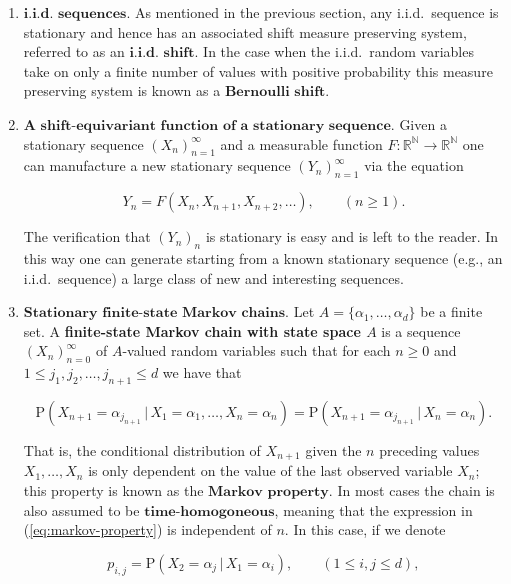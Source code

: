 \documentclass[11pt]{report}
\newcommand{\R}{\mathbb{R}}
\newcommand{\N}{\mathbb{N}}
\theoremstyle{plain}
\theoremstyle{definition}
\begin{document}
\begin{enumerate}[label=\arabic*.]
\item $\textbf{i.i.d. sequences.}$ As mentioned in the previous section, any i.i.d.\ sequence is stationary and hence has an associated shift measure preserving system, referred to as an $\textbf{i.i.d. shift}$. In the case when the i.i.d.\ random variables take on only a finite number of values with positive probability this measure preserving system is known as a $\textbf{Bernoulli shift}$.
\item $\textbf{A shift-equivariant function of a stationary sequence.}$ Given a stationary sequence $(X_n)_{n=1}^\infty$ and a measurable function $F:\R^\N\to\R^\N$ one can manufacture a new stationary sequence $(Y_n)_{n=1}^\infty$ via the equation

\begin{equation*} \tag{15}\label{eq:shift-equivariant}
Y_n = F(X_n,X_{n+1},X_{n+2},\ldots), \qquad (n\ge 1).
\end{equation*}

The verification that $(Y_n)_n$ is stationary is easy and is left to the reader. In this way one can generate starting from a known stationary sequence (e.g., an i.i.d.\ sequence) a large class of new and interesting sequences.
\item $\textbf{Stationary finite-state Markov chains.}$ Let $A=\{\alpha_1,\ldots,\alpha_d\}$ be a finite set. A \textbf{finite-state Markov chain with state space $A$} is a sequence $(X_n)_{n=0}^\infty$ of $A$-valued random variables such that for each $n\ge0$ and $1\le j_1,j_2,\ldots,j_{n+1}\le d$ we have that

\begin{equation*} \tag{16}\label{eq:markov-property}
\mathrm{P}(X_{n+1} = \alpha_{j_{n+1}}\,|\,X_1=\alpha_1,\ldots,X_n=\alpha_n)
=
\mathrm{P}(X_{n+1} = \alpha_{j_{n+1}}\,|\,X_n=\alpha_n).
\end{equation*}

That is, the conditional distribution of $X_{n+1}$ given the $n$ preceding values $X_1,\ldots,X_n$ is only dependent on the value of the last observed variable $X_n$; this property is known as the $\textbf{Markov property}$. In most cases the chain is also assumed to be $\textbf{time-homogoneous}$, meaning that the expression in (\ref{eq:markov-property}) is independent of $n$. In this case, if we denote

\[
p_{i,j} = \mathrm{P}(X_{2} = \alpha_j\,|\,X_1=\alpha_i), \qquad (1\le i,j\le d),
\]


\end{enumerate}
\end{document}
